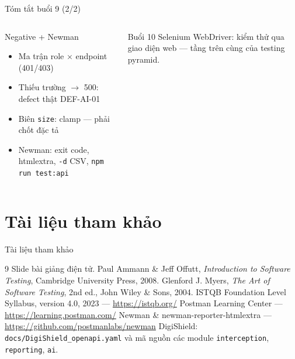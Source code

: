 \documentclass[aspectratio=169,12pt]{beamer}
\begin{document}
\begin{frame}{Tóm tắt buổi 9 (2/2)}
  \begin{columns}[T]
    \begin{block}{Negative + Newman}
      \begin{itemize}
        \item Ma trận role \(\times\) endpoint (401/403)
        \item Thiếu trường $\to$ 500: defect thật DEF-AI-01
        \item Biên \texttt{size}: clamp --- phải chốt đặc tả
        \item Newman: exit code, htmlextra, \texttt{-d} CSV, \texttt{npm run test:api}
      \end{itemize}
    \end{block}

    \begin{exampleblock}{Buổi 10}
      Selenium WebDriver: kiểm thử qua giao diện web ---
      tầng trên cùng của testing pyramid.
    \end{exampleblock}
  \end{columns}
\end{frame}

\section{Tài liệu tham khảo}

\begin{frame}{Tài liệu tham khảo}
  \vspace*{-0.4em}
  \footnotesize
  \begin{thebibliography}{9}
     Slide bài giảng điện tử.
     Paul Ammann \& Jeff Offutt, \emph{Introduction to Software Testing},
      Cambridge University Press, 2008.
     Glenford J. Myers, \emph{The Art of Software Testing}, 2nd ed.,
      John Wiley \& Sons, 2004.
     ISTQB Foundation Level Syllabus, version 4.0, 2023 ---
      \url{https://istqb.org/}
     Postman Learning Center --- \url{https://learning.postman.com/}
     Newman \& newman-reporter-htmlextra ---
      \url{https://github.com/postmanlabs/newman}
     DigiShield: \texttt{docs/DigiShield\_openapi.yaml} và mã nguồn
      các module \texttt{interception}, \texttt{reporting}, \texttt{ai}.
  \end{thebibliography}
\end{frame}

\end{document}

